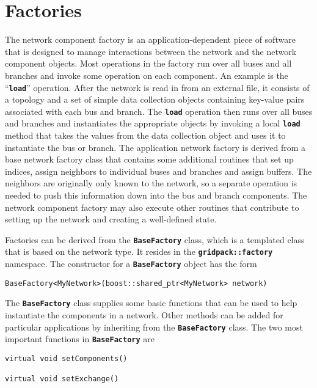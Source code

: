 \section{Factories}\label{factory}

The network component factory is an application-dependent piece of software that is designed to manage interactions between the network and the network component objects. Most operations in the factory run over all buses and all branches and invoke some operation on each component. An example is the ``\texttt{\textbf{load}}'' operation. After the network is read in from an external file, it consists of a topology and a set of simple data collection objects containing key-value pairs associated with each bus and branch. The \texttt{\textbf{load}} operation then runs over all buses and branches and instantiates the appropriate objects by invoking a local \texttt{\textbf{load}} method that takes the values from the data collection object and uses it to instantiate the bus or branch. The application network factory is derived from a base network factory class that contains some additional routines that set up indices, assign neighbors to individual buses and branches and assign buffers. The neighbors are originally only known to the network, so a separate operation is needed to push this information down into the bus and branch components. The network component factory may also execute other routines that contribute to setting up the network and creating a well-defined state.

Factories can be derived from the \texttt{\textbf{BaseFactory}} class, which is a templated class that is based on the network type. It resides in the \texttt{\textbf{gridpack::factory}} namespace. The constructor for a \texttt{\textbf{BaseFactory}} object has the form

{
\color{red}
\begin{Verbatim}[fontseries=b]
BaseFactory<MyNetwork>(boost::shared_ptr<MyNetwork> network)
\end{Verbatim}
}

The \texttt{\textbf{BaseFactory}} class supplies some basic functions that can be used to help instantiate the components in a network. Other methods can be added for particular applications by inheriting from the \texttt{\textbf{BaseFactory}} class. The two most important functions in \texttt{\textbf{BaseFactory}} are

{
\color{red}
\begin{Verbatim}[fontseries=b]
virtual void setComponents()

virtual void setExchange()
\end{Verbatim}
}

